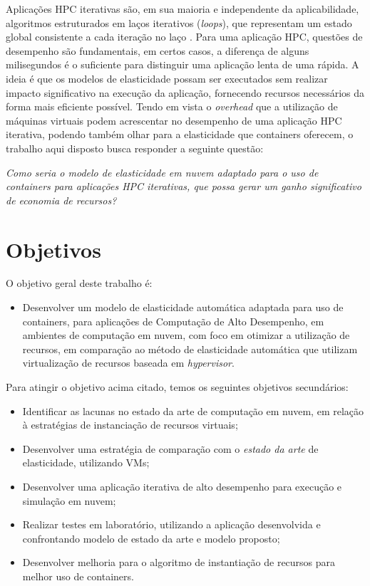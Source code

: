 \documentclass[twoside,english,brazilian]{UNISINOSmonografia}
\begin{document}
Aplicações HPC iterativas são, em sua maioria e independente da aplicabilidade, algoritmos estruturados em laços iterativos (\textit{loops}), que representam um estado global consistente a cada iteração no laço \cite{Facco2016}. Para uma aplicação HPC, questões de desempenho são fundamentais, em certos casos, a diferença de alguns milisegundos é o suficiente para distinguir uma aplicação lenta de uma rápida. A ideia é que os modelos de elasticidade possam ser executados sem realizar impacto significativo na execução da aplicação, fornecendo recursos necessários da forma mais eficiente possível. Tendo em vista o \textit{overhead} que a utilização de máquinas virtuais podem acrescentar no desempenho de uma aplicação HPC iterativa, podendo também olhar para a elasticidade que containers oferecem, o trabalho aqui disposto busca responder a seguinte questão:

	\textit{Como seria o modelo de elasticidade em nuvem adaptado para o uso de containers para aplicações HPC iterativas, que possa gerar um ganho significativo de economia de recursos?} 


\section{Objetivos} 
	O objetivo geral deste trabalho é:
	\begin{itemize}
		\item Desenvolver um modelo de elasticidade automática adaptada para uso de containers, para aplicações de Computação de Alto Desempenho, em ambientes de computação em nuvem, com foco em otimizar a utilização de recursos, em comparação ao método de elasticidade automática que utilizam virtualização de recursos baseada em \textit{hypervisor}.  
	\end{itemize}
	Para atingir o objetivo acima citado, temos os seguintes objetivos secundários:
	\begin{itemize}
		\item Identificar as lacunas no estado da arte de computação em nuvem, em relação à estratégias de instanciação de recursos virtuais;
		\item Desenvolver uma estratégia de comparação com o \textit{estado da arte} de elasticidade, utilizando VMs;
		\item Desenvolver uma aplicação iterativa de alto desempenho para execução e simulação em nuvem;
		\item Realizar testes em laboratório, utilizando a aplicação desenvolvida e confrontando modelo de estado da arte e modelo proposto;
		\item Desenvolver melhoria para o algoritmo de instantiação de recursos para melhor uso de containers.
	\end{itemize}
\end{document}
